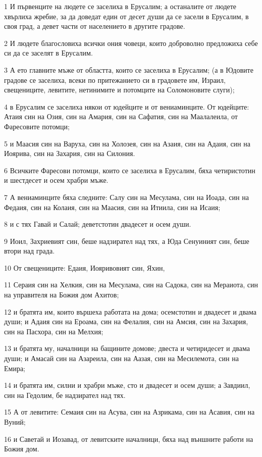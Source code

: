\par 1 И първенците на людете се заселиха в Ерусалим; а останалите от людете хвърлиха жребие, за да доведат един от десет души да се засели в Ерусалим, в своя град, а девет части от населението в другите градове.
\par 2 И людете благословиха всички ония човеци, които доброволно предложиха себе си да се заселят в Ерусалим.
\par 3 А ето главните мъже от областта, които се заселиха в Ерусалим; (а в Юдовите градове се заселиха, всеки по притежанието си в градовете им, Израил, свещениците, левитите, нетинимите и потомците на Соломоновите слуги);
\par 4 в Ерусалим се заселиха някои от юдейците и от вениаминците. От юдейците: Атаия син на Озия, син на Амария, син на Сафатия, син на Маалалеила, от Фаресовите потомци;
\par 5 и Маасия син на Варуха, син на Холозея, син на Азаия, син на Адаия, син на Иоярива, син на Захария, син на Силония.
\par 6 Всичките Фаресови потомци, които се заселиха в Ерусалим, бяха четиристотин и шестдесет и осем храбри мъже.
\par 7 А вениаминците бяха следните: Салу син на Месулама, син на Иоада, син на Федаия, син на Колаия, син на Маасия, син на Итиила, син на Исаия;
\par 8 и с тях Гавай и Салай; деветстотин двадесет и осем души.
\par 9 Иоил, Захриевият син, беше надзирател над тях, а Юда Сенуиният син, беше втори над града.
\par 10 От свещениците: Едаия, Иояривовият син, Яхин,
\par 11 Сераия син на Хелкия, син на Месулама, син на Садока, син на Мераиота, син на управителя на Божия дом Ахитов;
\par 12 и братята им, които вършеха работата на дома; осемстотин и двадесет и двама души; и Адаия син на Ероама, син на Фелалия, син на Амсия, син на Захария, син на Пасхора, син на Мелхия;
\par 13 и братята му, началници на бащините домове; двеста и четиридесет и двама души; и Амасай син на Азареила, син на Аазая, син на Месилемота, син на Емира;
\par 14 и братята им, силни и храбри мъже, сто и двадесет и осем души; а Завдиил, син на Гедолим, бе надзирател над тях.
\par 15 А от левитите: Семаия син на Асува, син на Азрикама, син на Асавия, син на Вуний;
\par 16 и Саветай и Иозавад, от левитските началници, бяха над външните работи на Божия дом.
